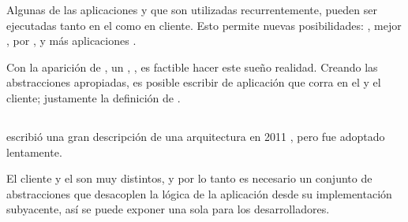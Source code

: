 Algunas de las aplicaciones y \viewLogicAS que son utilizadas recurrentemente, pueden ser ejecutadas tanto en el \serverAS como en cliente. Esto permite nuevas posibilidades: \performanceQA \optimizationQA, mejor \maintainabilityQA, \seoINT por , y más  aplicaciones \webINT \statefulINT.

Con la aparición de \nodejsNAME, un \fastQA, \stableQA \serverSideAS \javaScriptNAME \runtimeCPT, es factible hacer este sueño realidad. Creando las abstracciones apropiadas, es posible escribir \logicAS de aplicación que corra en el \serverAS y el cliente; justamente la definición de \isomorphicAS \javaScriptNAME.

\subsection{\isomorphicAS \javaScriptNAME \frameworksPC}
\label{cap:justificacion:subsection:isomorphic_javaScript_framework}

\nodejitsuNAME escribió una gran descripción de una arquitectura \isomorphicAS \javaScriptNAME en 2011 \cite{online_nodejitsu_scaling_iso_js_code}, pero fue adoptado lentamente.


El cliente y el \serverAS son \environmentsPL muy distintos, y por lo tanto es necesario un conjunto de abstracciones que desacoplen la lógica de la aplicación desde su implementación subyacente, así se puede exponer una sola \apiAS para los desarrolladores.


